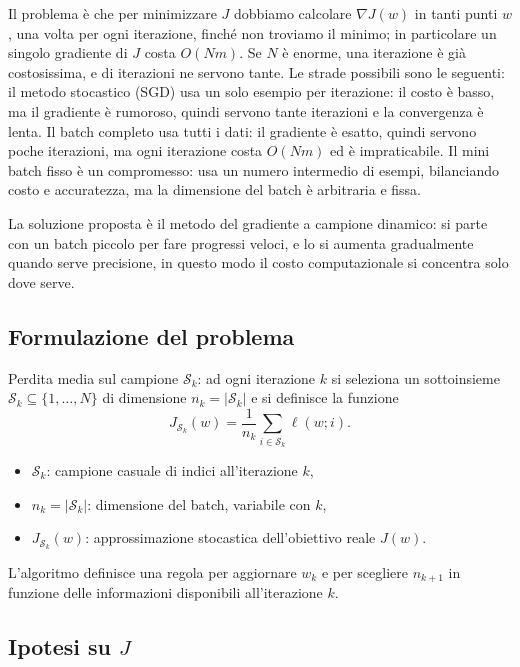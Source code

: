 \documentclass[a4paper,12pt]{article}
\begin{document}
Il problema è che per minimizzare \(J\) dobbiamo calcolare \(\nabla J(w)\) in tanti punti \(w\), una volta per ogni iterazione, finché non troviamo il minimo; in particolare un singolo gradiente di \(J\) costa \(O(Nm)\). Se \(N\) è enorme, una iterazione è già costosissima, e di iterazioni ne servono tante. Le strade possibili sono le seguenti: il metodo stocastico (SGD) usa un solo esempio per iterazione: il costo è basso, ma il gradiente è rumoroso, quindi servono tante iterazioni e la convergenza è lenta.
Il batch completo usa tutti i dati: il gradiente è esatto, quindi servono poche iterazioni, ma ogni iterazione costa \(O(Nm)\) ed è impraticabile.
Il mini batch fisso è un compromesso: usa un numero intermedio di esempi, bilanciando costo e accuratezza, ma la dimensione del batch è arbitraria e fissa.

La soluzione proposta è il metodo del gradiente a campione dinamico: si parte con un batch piccolo per fare progressi veloci, e lo si aumenta gradualmente quando serve precisione, in questo modo il costo computazionale si concentra solo dove serve.


\subsection{Formulazione del problema}

\begin{definitionbox}
  Perdita media sul campione $\mathcal{S}_k$: ad ogni iterazione $k$ si seleziona un sottoinsieme $\mathcal{S}_k \subseteq \{1,\dots,N\}$ di dimensione $n_k = |\mathcal{S}_k|$ e si definisce la funzione
  \[
    J_{\mathcal{S}_k}(w) = \frac{1}{n_k} \sum_{i \in \mathcal{S}_k} \ell(w;i).
  \]
  \begin{itemize}
    \item $\mathcal{S}_k$: campione casuale di indici all'iterazione $k$,
    \item $n_k = |\mathcal{S}_k|$: dimensione del batch, variabile con $k$,
    \item $J_{\mathcal{S}_k}(w)$: approssimazione stocastica dell'obiettivo reale $J(w)$.
  \end{itemize}
  L'algoritmo definisce una regola per aggiornare $w_k$ e per scegliere $n_{k+1}$ in funzione delle informazioni disponibili all'iterazione $k$.
\end{definitionbox}
\subsection{Ipotesi su $J$}
\end{document}
